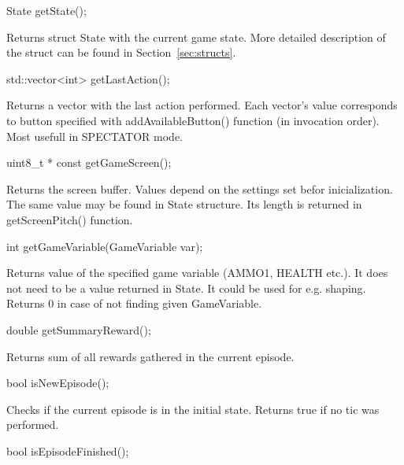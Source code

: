 \vspace{20pt}
\begin{clinee}
	State getState();
\end{clinee}

Returns struct State with the current game state. More detailed description of the struct can be found in Section~\ref{sec:structs}.


\vspace{20pt}
\begin{clinee}
	std::vector<int> getLastAction();
\end{clinee}

Returns a vector with the last action performed. Each vector's value corresponds to button specified with addAvailableButton() function (in invocation order). Most usefull in SPECTATOR mode.


\vspace{20pt}
\begin{clinee}
	uint8_t * const getGameScreen();
\end{clinee}

Returns the screen buffer. Values depend on the settings set befor inicialization. The same value may be found in State structure. Its length is returned in getScreenPitch() function.


\vspace{20pt}
\begin{clinee}
	int getGameVariable(GameVariable var);
\end{clinee}

Returns value of the specified game variable (AMMO1, HEALTH etc.). It does not need to be a value returned in State.
It could be used for e.g. shaping. Returns 0 in case of not finding given GameVariable.


\vspace{20pt}
\begin{clinee}
	double getSummaryReward();
\end{clinee}

Returns sum of all rewards gathered in the current episode.


\vspace{20pt}
\begin{clinee}
	bool isNewEpisode();
\end{clinee}

Checks if the current episode is in the initial state. Returns true if no tic was performed.


\vspace{20pt}
\begin{clinee}
	bool isEpisodeFinished();
\end{clinee}

